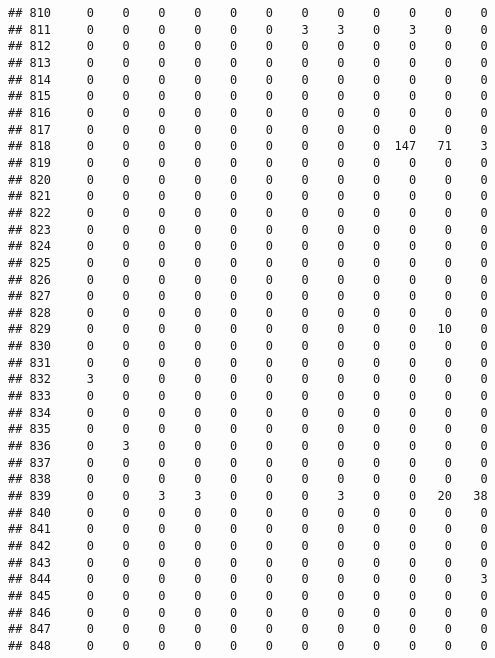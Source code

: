 \documentclass[]{article}
\begin{document}
\begin{verbatim}
## 810     0    0    0    0    0    0    0    0    0    0    0    0
## 811     0    0    0    0    0    0    3    3    0    3    0    0
## 812     0    0    0    0    0    0    0    0    0    0    0    0
## 813     0    0    0    0    0    0    0    0    0    0    0    0
## 814     0    0    0    0    0    0    0    0    0    0    0    0
## 815     0    0    0    0    0    0    0    0    0    0    0    0
## 816     0    0    0    0    0    0    0    0    0    0    0    0
## 817     0    0    0    0    0    0    0    0    0    0    0    0
## 818     0    0    0    0    0    0    0    0    0  147   71    3
## 819     0    0    0    0    0    0    0    0    0    0    0    0
## 820     0    0    0    0    0    0    0    0    0    0    0    0
## 821     0    0    0    0    0    0    0    0    0    0    0    0
## 822     0    0    0    0    0    0    0    0    0    0    0    0
## 823     0    0    0    0    0    0    0    0    0    0    0    0
## 824     0    0    0    0    0    0    0    0    0    0    0    0
## 825     0    0    0    0    0    0    0    0    0    0    0    0
## 826     0    0    0    0    0    0    0    0    0    0    0    0
## 827     0    0    0    0    0    0    0    0    0    0    0    0
## 828     0    0    0    0    0    0    0    0    0    0    0    0
## 829     0    0    0    0    0    0    0    0    0    0   10    0
## 830     0    0    0    0    0    0    0    0    0    0    0    0
## 831     0    0    0    0    0    0    0    0    0    0    0    0
## 832     3    0    0    0    0    0    0    0    0    0    0    0
## 833     0    0    0    0    0    0    0    0    0    0    0    0
## 834     0    0    0    0    0    0    0    0    0    0    0    0
## 835     0    0    0    0    0    0    0    0    0    0    0    0
## 836     0    3    0    0    0    0    0    0    0    0    0    0
## 837     0    0    0    0    0    0    0    0    0    0    0    0
## 838     0    0    0    0    0    0    0    0    0    0    0    0
## 839     0    0    3    3    0    0    0    3    0    0   20   38
## 840     0    0    0    0    0    0    0    0    0    0    0    0
## 841     0    0    0    0    0    0    0    0    0    0    0    0
## 842     0    0    0    0    0    0    0    0    0    0    0    0
## 843     0    0    0    0    0    0    0    0    0    0    0    0
## 844     0    0    0    0    0    0    0    0    0    0    0    3
## 845     0    0    0    0    0    0    0    0    0    0    0    0
## 846     0    0    0    0    0    0    0    0    0    0    0    0
## 847     0    0    0    0    0    0    0    0    0    0    0    0
## 848     0    0    0    0    0    0    0    0    0    0    0    0

\end{verbatim}
\end{document}

